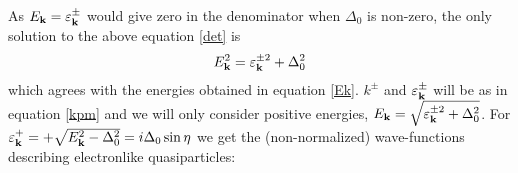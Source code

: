 \begin{comment}
    \\ &= 
    \det\begin{pmatrix}(\varepsilon^{\pm}_{k} -E_{k})\hat{\sigma}_0\end{pmatrix}
    \det\begin{pmatrix}
    -(\varepsilon^{\pm}_{k} + E_{k})\hat{\sigma}_0 + i\Delta^*\hat{\sigma}_2\frac{1}{\varepsilon^{\pm}_{k}-E_{k}}i\Delta\hat{\sigma}_2
    \end{pmatrix}
where we have used the relation 
\begin{equation}
\det\begin{pmatrix}
A & B \\ C & D
\end{pmatrix}
= \det\big(A\big)\det\big(D-CA^{-1}B\big).
\end{equation}
\end{comment}
As $E_{\mathbf{k}} = \varepsilon^{\pm}_{\mathbf{k}}$ would give zero in the denominator when $\Delta_0$ is non-zero, the only solution to the above equation \eqref{det} is
\begin{equation}
E_{\mathbf{k}}^2 = \varepsilon^{\pm2}_{\mathbf{k}} + \Delta_0^2
\end{equation}
which agrees with the energies obtained in equation \eqref{Ek}. $k^{\pm}$ and $\varepsilon^{\pm}_{\mathbf{k}}$ will be as in equation \eqref{kpm} and we will only consider positive energies, $E_{\mathbf{k}}=\sqrt{\varepsilon^{\pm2}_{\mathbf{k}} + \Delta_0^2}$. For $\varepsilon^+_{\mathbf{k}} = +\sqrt{E_{\mathbf{k}}^2-\Delta_0^2} = i\Delta_0\sin\eta$ we get the (non-normalized) wave-functions describing electronlike quasiparticles:
\begin{comment}
We find the wave functions corresponding to the eigenvalue $+E_{k,S}$, by reducing the matrix
\begin{equation}
\begin{pmatrix}
\big(\varepsilon_{k,S} - E_{k,S}\big) \hat{\sigma}_0 & i\Delta\hat{\sigma}_2 \\
-i\Delta^*\hat{\sigma}_2 & -\big(\varepsilon_{k,S} + E_{k,S}\big)\hat{\sigma_0}  
\end{pmatrix}
\sim
\begin{pmatrix}
\hat{\sigma}_0 & -i\frac{u_0}{v_0}e^{i\gamma}\hat{\sigma}_2 \\
0 & 0
\end{pmatrix}
\end{equation}
which give the solutions
\end{comment}
